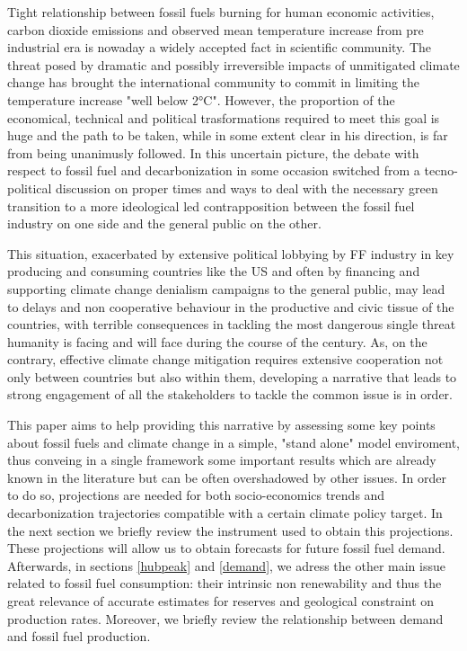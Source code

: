 \documentclass[11pt]{article} %
\begin{document}
Tight relationship between fossil fuels burning for human economic activities, carbon dioxide emissions and observed mean temperature increase from pre industrial era is nowaday a widely accepted fact in scientific community. The threat posed by dramatic and possibly irreversible impacts of unmitigated climate change has brought the international community to commit in limiting the temperature increase "well below 2°C". However, the proportion of the economical, technical and political trasformations required to meet this goal is huge and the path to be taken, while in some extent clear in his direction, is far from being unanimusly followed. In this uncertain picture, the debate with respect to fossil fuel and decarbonization in some occasion switched from a tecno-political discussion on proper times and ways to deal with the necessary green transition to a more ideological led contrapposition between the fossil fuel industry on one side and the general public on the other. \par This situation, exacerbated by extensive political lobbying by FF industry in key producing and consuming countries like the US and often by financing and supporting climate change denialism campaigns to the general public, may lead to delays and non cooperative behaviour in the productive and civic tissue of the countries, with terrible consequences in tackling the most dangerous single threat humanity is facing and will face during the course of the century. As, on the contrary, effective climate change mitigation requires extensive cooperation not only between countries but also within them, developing a narrative that leads to strong engagement of all the stakeholders to tackle the common issue is in order. 
\par This paper aims to help providing this narrative by assessing some key points about fossil fuels and climate change in a simple, "stand alone" model enviroment, thus conveing in a single framework some important results which are already known in the literature but can be often overshadowed by other issues.
In order to do so, projections are needed for both socio-economics trends and decarbonization trajectories compatible with a certain climate policy target. In the next section we briefly review the instrument used to obtain this projections. These projections will allow us to obtain forecasts for future fossil fuel demand. Afterwards, in sections \ref{hubpeak} and \ref{demand}, we adress the other main issue related to fossil fuel consumption: their intrinsic non renewability and thus the great relevance of accurate estimates for reserves and geological constraint on production rates. Moreover, we briefly review the relationship between demand and fossil fuel production.
\end{document}
